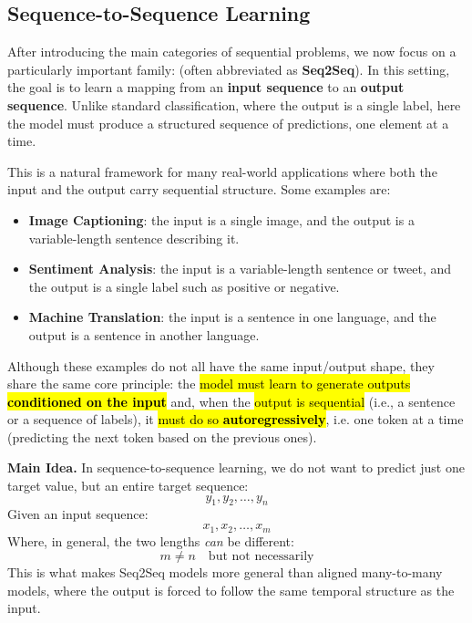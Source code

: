 \subsection{Sequence-to-Sequence Learning}

After introducing the main categories of sequential problems, we now focus on a particularly important family:  (often abbreviated as \textbf{Seq2Seq}). In this setting, the goal is to learn a mapping from an \textbf{input sequence} to an \textbf{output sequence}. Unlike standard classification, where the output is a single label, here the model must produce a structured sequence of predictions, one element at a time.

\highspace
This is a natural framework for many real-world applications where both the input and the output carry sequential structure. Some examples are:
\begin{itemize}
    \item \textbf{Image Captioning}: the input is a single image, and the output is a variable-length sentence describing it.
    \item \textbf{Sentiment Analysis}: the input is a variable-length sentence or tweet, and the output is a single label such as positive or negative.
    \item \textbf{Machine Translation}: the input is a sentence in one language, and the output is a sentence in another language.
\end{itemize}
Although these examples do not all have the same input/output shape, they share the same core principle: the \hl{model must learn to generate outputs \textbf{conditioned on the input}} and, when the \hl{output is sequential} (i.e., a sentence or a sequence of labels), it \hl{must do so \textbf{autoregressively}}, i.e. one token at a time (predicting the next token based on the previous ones).

\highspace
\textcolor{Green3}{ \textbf{Main Idea.}} In sequence-to-sequence learning, we do not want to predict just one target value, but an entire target sequence:
\begin{equation*}
    y_1, y_2, \ldots, y_n
\end{equation*}
Given an input sequence:
\begin{equation*}
    x_1, x_2, \ldots, x_m
\end{equation*}
Where, in general, the two lengths \emph{can} be different:
\begin{equation*}
    m \neq n \quad \text{but not necessarily}
\end{equation*}
This is what makes Seq2Seq models more general than aligned many-to-many models, where the output is forced to follow the same temporal structure as the input.

